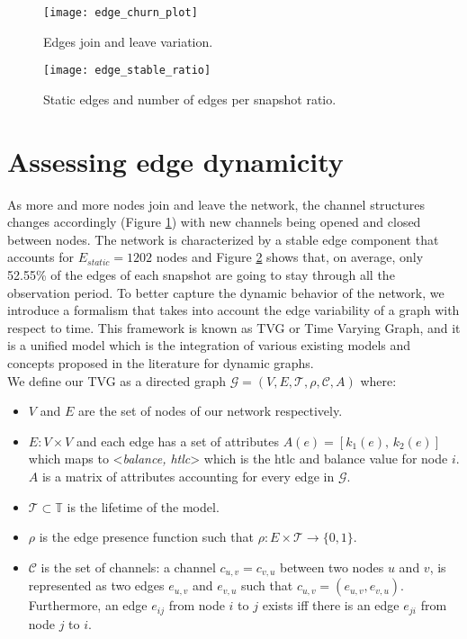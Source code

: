 	\begin{figure}[h]
		\texttt{[image: edge\_churn\_plot]}
		\caption{Edges join and leave variation.}
		\label{fig:edge_churn}
	\end{figure}

	\begin{figure}[t]
		\texttt{[image: edge\_stable\_ratio]}
		\caption{Static edges and number of edges per snapshot ratio.}
		\label{fig:edge_stable_ratio}
	\end{figure}
	
	\section{Assessing edge dynamicity}
	
	As more and more nodes join and leave the network, the channel structures changes accordingly (Figure \ref{fig:edge_churn}) with new channels being opened and closed between nodes. The network is characterized by a stable edge component that accounts for $E_{static} = 1202$ nodes and Figure \ref{fig:edge_stable_ratio} shows that, on average,  only 52.55\% of the edges of each snapshot are going to stay through all the observation period.	To better capture the dynamic behavior of the network, we introduce a formalism that takes into account the edge variability of a graph with respect to time. This framework is known as TVG or Time Varying Graph, and it is a unified model which is the integration of various existing models and concepts proposed in the literature for dynamic graphs. \\
	We define our TVG as a directed graph $\mathcal{G} = (V, E, \mathcal{T}, \rho, \mathcal{C}, A)$ where:
	\begin{itemize}
		\item $V$ and $E$ are the set of nodes of our network respectively. 
		\item $E: V \times V$ and each edge has a set of attributes $A(e) = [k_1(e),\, k_2(e)]$ which maps to <\textit{balance, htlc}> which is the htlc and balance value for node $i$. $A$ is a matrix of attributes accounting for every edge in $\mathcal{G}$.
		\item $\mathcal{T} \subset \mathbb{T}$ is the lifetime of the model.
		\item $\rho$ is the edge presence function such that $\rho: E \times \mathcal{T} \to \{0,1\}$.
		\item $\mathcal{C}$ is the set of channels: a channel $c_{u,v} = c_{v,u}$ between two nodes $u$ and $v$, is represented as two edges $e_{u,v}$ and $e_{v,u}$ such that $c_{u,v} = (e_{u,v}, e_{v,u})$. Furthermore, an edge $e_{ij}$ from node $i$ to $j$ exists iff there is an edge $e_{ji}$  from node $j$ to $i$.
	\end{itemize}
	
